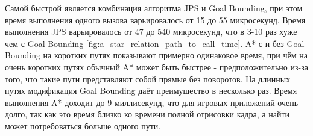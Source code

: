  Самой быстрой является комбинация алгоритма JPS и Goal Bounding, при этом время выполнения одного вызова варьировалось от 15 до 55 микросекунд. Время выполнения JPS варьировалось от 47 до 540 микросекунд, что в 3-10 раз хуже чем с Goal Bounding \cref{fig:a_star_relation_path_to_call_time}. A* с и без Goal Bounding на коротких путях показывают примерно одинаковое время, при чём на очень коротких путях обычный A* может быть быстрее - предположительно из-за того, что такие пути представляют собой прямые без поворотов. На длинных путях модификация Goal Bounding даёт преимущество в несколько раз. Время выполнения A* доходит до 9 миллисекунд, что для игровых приложений очень долго, так как это время близко ко времени полной отрисовки кадра, а найти может потребоваться больше одного пути.

